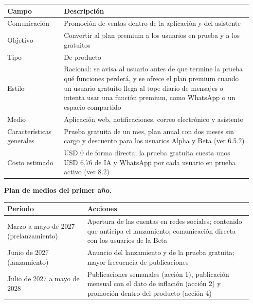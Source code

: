 {\def\LTcaptype{none} %
\begin{longtable}[]{@{}
  >{\raggedright\arraybackslash}p{}
  >{\raggedright\arraybackslash}p{}@{}}
\toprule\noalign{}
\begin{minipage}[b]{\linewidth}\raggedright
Campo
\end{minipage} & \begin{minipage}[b]{\linewidth}\raggedright
Descripción
\end{minipage} \\
\midrule\noalign{}
\endhead
\bottomrule\noalign{}
\endlastfoot
Comunicación & Promoción de ventas dentro de la aplicación y del
asistente \\
Objetivo & Convertir al plan premium a los usuarios en prueba y a los
gratuitos \\
Tipo & De producto \\
Estilo & Racional: se avisa al usuario antes de que termine la prueba
qué funciones perderá, y se ofrece el plan premium cuando un usuario
gratuito llega al tope diario de mensajes o intenta usar una función
premium, como WhatsApp o un espacio compartido \\
Medio & Aplicación web, notificaciones, correo electrónico y
asistente \\
Características generales & Prueba gratuita de un mes, plan anual con
dos meses sin cargo y descuento para los usuarios Alpha y Beta (ver
6.5.2) \\
Costo estimado & USD 0 de forma directa; la prueba gratuita cuesta unos
USD 6,76 de IA y WhatsApp por cada usuario en prueba activo (ver 8.2) \\
\end{longtable}
}

\textbf{Plan de medios del primer año.}

{\def\LTcaptype{none} %
\begin{longtable}[]{@{}
  >{\raggedright\arraybackslash}p{}
  >{\raggedright\arraybackslash}p{}@{}}
\toprule\noalign{}
\begin{minipage}[b]{\linewidth}\raggedright
Período
\end{minipage} & \begin{minipage}[b]{\linewidth}\raggedright
Acciones
\end{minipage} \\
\midrule\noalign{}
\endhead
\bottomrule\noalign{}
\endlastfoot
Marzo a mayo de 2027 (prelanzamiento) & Apertura de las cuentas en redes
sociales; contenido que anticipa el lanzamiento; comunicación directa
con los usuarios de la Beta \\
Junio de 2027 (lanzamiento) & Anuncio del lanzamiento y de la prueba
gratuita; mayor frecuencia de publicaciones \\
Julio de 2027 a mayo de 2028 & Publicaciones semanales (acción 1),
publicación mensual con el dato de inflación (acción 2) y promoción
dentro del producto (acción 4) \\
\end{longtable}
}

